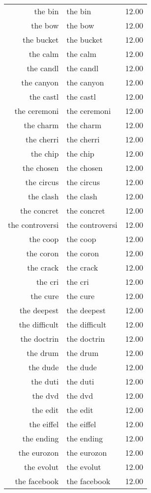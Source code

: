\begin{table}[ht]
\begin{tabular}{rlr}
  the bin & the bin & 12.00 \\ 
  the bow & the bow & 12.00 \\ 
  the bucket & the bucket & 12.00 \\ 
  the calm & the calm & 12.00 \\ 
  the candl & the candl & 12.00 \\ 
  the canyon & the canyon & 12.00 \\ 
  the castl & the castl & 12.00 \\ 
  the ceremoni & the ceremoni & 12.00 \\ 
  the charm & the charm & 12.00 \\ 
  the cherri & the cherri & 12.00 \\ 
  the chip & the chip & 12.00 \\ 
  the chosen & the chosen & 12.00 \\ 
  the circus & the circus & 12.00 \\ 
  the clash & the clash & 12.00 \\ 
  the concret & the concret & 12.00 \\ 
  the controversi & the controversi & 12.00 \\ 
  the coop & the coop & 12.00 \\ 
  the coron & the coron & 12.00 \\ 
  the crack & the crack & 12.00 \\ 
  the cri & the cri & 12.00 \\ 
  the cure & the cure & 12.00 \\ 
  the deepest & the deepest & 12.00 \\ 
  the difficult & the difficult & 12.00 \\ 
  the doctrin & the doctrin & 12.00 \\ 
  the drum & the drum & 12.00 \\ 
  the dude & the dude & 12.00 \\ 
  the duti & the duti & 12.00 \\ 
  the dvd & the dvd & 12.00 \\ 
  the edit & the edit & 12.00 \\ 
  the eiffel & the eiffel & 12.00 \\ 
  the ending & the ending & 12.00 \\ 
  the eurozon & the eurozon & 12.00 \\ 
  the evolut & the evolut & 12.00 \\ 
  the facebook & the facebook & 12.00 \\ 

\end{tabular}
\end{table}
